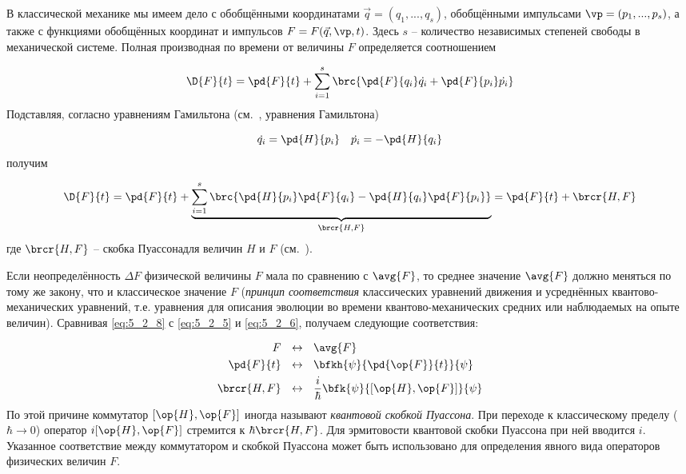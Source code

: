 В классической механике мы имеем дело с обобщёнными координатами $\vec{q} = (q_1, ..., q_s)$, обобщёнными импульсами $\vp = (p_1, ..., p_s)$, а также с функциями обобщённых координат и импульсов $F = F(\vec{q}, \vp, t)$. Здесь $s$ -- количество независимых степеней свободы в механической системе. Полная производная по времени от величины $F$ определяется соотношением

$$
\D{F}{t} = \pd{F}{t} + \sum_{i=1}^{s}\brc{\pd{F}{q_i} \dot{q_i} + \pd{F}{p_i} \dot{p_i} }
$$%
%
Подставляя, согласно уравнениям Гамильтона (см.~, уравнения Гамильтона)

$$
\dot{q_i} = \pd{H}{p_i} ~~~ \dot{p_i} = -\pd{H}{q_i}
$$%
%
получим

\begin{equation}
  \label{eq:5_2_8}
  \D{F}{t} = \pd{F}{t} + \underbrace{
    \sum_{i=1}^{s} \brc{ \pd{H}{p_i} \pd{F}{q_i} - \pd{H}{q_i} \pd{F}{p_i} }
  }_{\brcr{H, F}} = \pd{F}{t} + \brcr{H, F}
\end{equation}%
%
где $\brcr{H, F}$ -- скобка Пуассона\footnotemark для величин $H$ и $F$ (см.~).

Если неопределённость $\Delta F$ физической величины $F$ мала по сравнению с $\avg{F}$, то среднее значение $\avg{F}$ должно меняться по тому же закону, что и классическое значение $F$ ({\em принцип соответствия} классических уравнений движения и усреднённых квантово-механических уравнений, т.е. уравнения для описания эволюции во времени квантово-механических средних или наблюдаемых на опыте величин). Сравнивая \eqref{eq:5_2_8} с \eqref{eq:5_2_5} и \eqref{eq:5_2_6}, получаем следующие соответствия:

$$
\begin{aligned}
F ~~&\leftrightarrow~~ \avg{F} \\
\pd{F}{t} ~~&\leftrightarrow~~ \bfkh{\psi}{\pd{\op{F}}{t}}{\psi} \\
\brcr{H, F} ~~&\leftrightarrow~~ \frac{i}{\hbar} \bfk{\psi}{ [\op{H}, \op{F}] }{\psi}
\end{aligned}
$$%
%
По этой причине коммутатор $[\op{H}, \op{F}]$ иногда называют {\em квантовой скобкой Пуассона}. При переходе к классическому пределу ($\hbar \to 0$) оператор $i[\op{H}, \op{F}]$ стремится к $\hbar \brcr{H, F}$. Для эрмитовости квантовой скобки Пуассона при ней вводится $i$. Указанное соответствие между коммутатором и скобкой Пуассона может быть использовано для определения явного вида операторов физических величин $F$.

